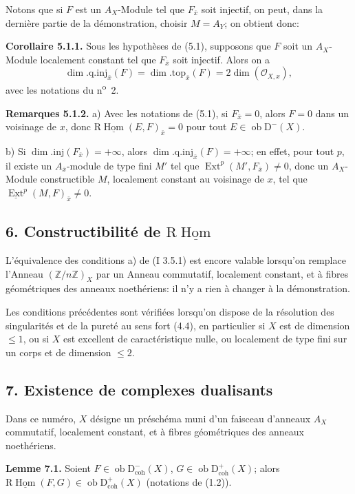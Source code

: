 \documentclass[11pt]{article}
\DeclareMathOperator{\Hom}{Hom}
\DeclareMathOperator{\Ext}{Ext}
\newcommand{\R}{\mathrm{R}}
\newcommand{\D}{\mathrm{D}}
\newcommand{\Z}{\mathbb{Z}}
\newcommand{\ob}{\operatorname{ob}}
\providecommand{\Hom}{\operatorname{Hom}}
\providecommand{\ob}{\operatorname{ob}}
\providecommand{\R}{\mathrm R}
\providecommand{\Z}{\mathbb Z}
\providecommand{\Hom}{\operatorname{Hom}}
\begin{document}
Notons que si $F$ est un $A_X$-Module tel que $F_{\bar{x}}$ soit injectif, on peut, dans la dernière partie de la démonstration, choisir $M=A_Y$; on obtient donc:

\textbf{Corollaire 5.1.1.} Sous les hypothèses de (5.1), supposons que $F$ soit un $A_X$-Module localement constant tel que $F_{\bar{x}}$ soit injectif. Alors on a
\[
        \dim.\mathrm{q.inj}_{\bar{x}}(F)=\dim.\mathrm{top}_{\bar{x}}(F)=2\dim(\mathcal{O}_{X,x}),
\]
avec les notations du n\textsuperscript{o}~2.

\textbf{Remarques 5.1.2.} a) Avec les notations de (5.1), si $F_{\bar{x}}=0$, alors $F=0$ dans un voisinage de $x$, donc $\R\underline{\Hom}(E,F)_{\bar{x}}=0$ pour tout $E\in\ob\D^{-}(X)$.

b) Si $\dim.\mathrm{inj}(F_{\bar{x}})=+\infty$, alors $\dim.\mathrm{q.inj}_{\bar{x}}(F)=+\infty$; en effet, pour tout $p$, il existe un $A_{\bar{x}}$-module de type fini $M'$ tel que $\Ext^p(M',F_{\bar{x}})\neq0$, donc un $A_X$-Module constructible $M$, localement constant au voisinage de $x$, tel que $\underline{\Ext}^p(M,F)_{\bar{x}}\neq0$.

\subsection*{6. Constructibilité de $\R\underline{\Hom}$}

L'équivalence des conditions a) de (I 3.5.1) est encore valable lorsqu'on remplace l'Anneau $(\Z/n\Z)_X$ par un Anneau commutatif, localement constant, et à fibres géométriques des anneaux noethériens: il n'y a rien à changer à la démonstration.

Les conditions précédentes sont vérifiées lorsqu'on dispose de la résolution des singularités et de la pureté au sens fort (4.4), en particulier si $X$ est de dimension $\leq1$, ou si $X$ est excellent de caractéristique nulle, ou localement de type fini sur un corps et de dimension $\leq2$.

\subsection*{7. Existence de complexes dualisants}

Dans ce numéro, $X$ désigne un préschéma muni d'un faisceau d'anneaux $A_X$ commutatif, localement constant, et à fibres géométriques des anneaux noethériens.

\textbf{Lemme 7.1.} Soient $F\in\ob\D^{-}_{\mathrm{coh}}(X)$, $G\in\ob\D^{+}_{\mathrm{coh}}(X)$; alors $\R\underline{\Hom}(F,G)\in\ob\D^{+}_{\mathrm{coh}}(X)$ (notations de (1.2)).
\end{document}
